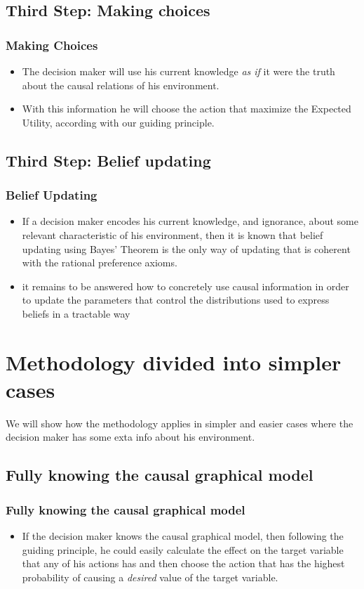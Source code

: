 \documentclass{beamer}
\theoremstyle{plain}
\begin{document}
\subsection{Third Step: Making choices}
\begin{frame}
\frametitle{Making Choices}
\begin{itemize}
\item The decision maker will use his current knowledge \textit{as if} it were the truth about the causal relations of his environment.
\item With this information he will choose the action that maximize the Expected Utility, according with our guiding principle.
\end{itemize}
\end{frame}

\subsection{Third Step: Belief updating}
\begin{frame}
\frametitle{Belief Updating}
\begin{itemize}
\item If a decision maker encodes his current knowledge, and ignorance, about some relevant characteristic of his environment, then it is known that belief updating using Bayes' Theorem is the only way of updating that is coherent with the rational preference axioms.
\item it remains to be answered how to concretely use causal information in order to update the parameters that control the distributions used to express beliefs in a tractable way
\end{itemize}
\end{frame}

\section{Methodology divided into simpler cases}
\begin{frame}
We will show how the methodology applies in simpler and easier cases where the decision maker has some exta info about his environment.
\end{frame}
\subsection{Fully knowing the causal graphical model}
\begin{frame}
\frametitle{Fully knowing the causal graphical model}
\begin{itemize}
\item If the decision maker knows the causal graphical model, then following the guiding principle, he could easily calculate the effect on the target variable that any of his actions has and then choose the action that has the highest probability of causing a \textit{desired} value of the target variable.
\end{itemize}
\end{frame}
\end{document}
